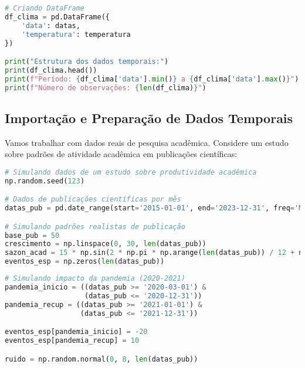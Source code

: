 \begin{pythonbox}
\begin{lstlisting}[language=Python]
# Criando DataFrame
df_clima = pd.DataFrame({
    'data': datas,
    'temperatura': temperatura
})

print("Estrutura dos dados temporais:")
print(df_clima.head())
print(f"Período: {df_clima['data'].min()} a {df_clima['data'].max()}")
print(f"Número de observações: {len(df_clima)}")
\end{lstlisting}
\end{pythonbox}

\subsection{Importação e Preparação de Dados Temporais}

\begin{examplebox}
Vamos trabalhar com dados reais de pesquisa acadêmica. Considere um estudo sobre padrões de atividade acadêmica em publicações científicas:
\end{examplebox}

\begin{pythonbox}
\begin{lstlisting}[language=Python]
# Simulando dados de um estudo sobre produtividade acadêmica
np.random.seed(123)

# Dados de publicações científicas por mês
datas_pub = pd.date_range(start='2015-01-01', end='2023-12-31', freq='M')

# Simulando padrões realistas de publicação
base_pub = 50
crescimento = np.linspace(0, 30, len(datas_pub))
sazon_acad = 15 * np.sin(2 * np.pi * np.arange(len(datas_pub)) / 12 + np.pi/2)
eventos_esp = np.zeros(len(datas_pub))
\end{lstlisting}
\end{pythonbox}

\begin{pythonbox}
\begin{lstlisting}[language=Python]
# Simulando impacto da pandemia (2020-2021)
pandemia_inicio = ((datas_pub >= '2020-03-01') & 
                   (datas_pub <= '2020-12-31'))
pandemia_recup = ((datas_pub >= '2021-01-01') & 
                  (datas_pub <= '2021-12-31'))

eventos_esp[pandemia_inicio] = -20
eventos_esp[pandemia_recup] = 10

ruido = np.random.normal(0, 8, len(datas_pub))
\end{lstlisting}
\end{pythonbox}

